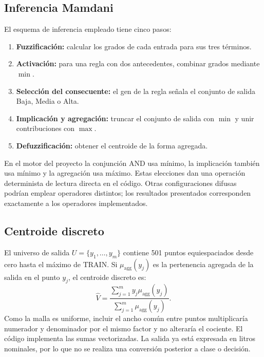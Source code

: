 \documentclass[11pt,letterpaper]{article}
\begin{document}
\subsection{Inferencia Mamdani}
El esquema de inferencia empleado tiene cinco pasos:
\begin{enumerate}
  \item \textbf{Fuzzificación:} calcular los grados de cada entrada para sus tres términos.
  \item \textbf{Activación:} para una regla con dos antecedentes, combinar grados mediante $\min$.
  \item \textbf{Selección del consecuente:} el gen de la regla señala el conjunto de salida Baja, Media o Alta.
  \item \textbf{Implicación y agregación:} truncar el conjunto de salida con $\min$ y unir contribuciones con $\max$.
  \item \textbf{Defuzzificación:} obtener el centroide de la forma agregada.
\end{enumerate}

En el motor del proyecto la conjunción AND usa mínimo, la implicación también usa mínimo y la agregación usa máximo. Estas elecciones dan una operación determinista de lectura directa en el código. Otras configuraciones difusas podrían emplear operadores distintos; los resultados presentados corresponden exactamente a los operadores implementados.

\subsection{Centroide discreto}
El universo de salida $U=\{y_1,\ldots,y_m\}$ contiene 501 puntos equiespaciados desde cero hasta el máximo de TRAIN. Si $\mu_{\mathrm{agg}}(y_j)$ es la pertenencia agregada de la salida en el punto $y_j$, el centroide discreto es:
\begin{equation}
  \widehat V = \frac{\sum_{j=1}^{m} y_j\mu_{\mathrm{agg}}(y_j)}{\sum_{j=1}^{m}\mu_{\mathrm{agg}}(y_j)}.
  \label{eq:centroide}
\end{equation}
Como la malla es uniforme, incluir el ancho común entre puntos multiplicaría numerador y denominador por el mismo factor y no alteraría el cociente. El código implementa las sumas vectorizadas. La salida ya está expresada en litros nominales, por lo que no se realiza una conversión posterior a clase o decisión.
\end{document}
